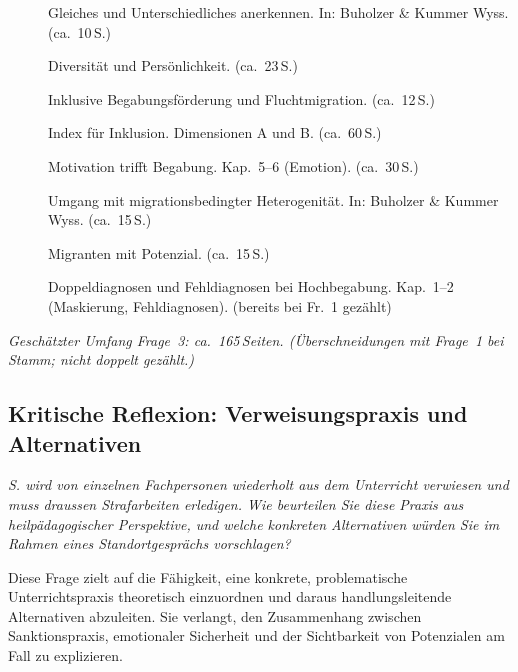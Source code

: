 \documentclass[ngerman, a4paper]{article}
\begin{document}
\begin{description}
  \item[\cite{grossrieder2010anerkennung}] Gleiches und Unterschiedliches anerkennen. In: Buholzer \& Kummer Wyss. (ca.~10\,S.)
  \item[\cite{kuhl2019diversitaet}] Diversität und Persönlichkeit. (ca.~23\,S.)
  \item[\cite{behrensen2019inklusive}] Inklusive Begabungsförderung und Fluchtmigration. (ca.~12\,S.)
  \item[\cite{booth2019index}] Index für Inklusion. Dimensionen A und B. (ca.~60\,S.)
  \item[\cite{lehwald2017motivation}] Motivation trifft Begabung. Kap.~5--6 (Emotion). (ca.~30\,S.)
  \item[\cite{kappus2010migration}] Umgang mit migrationsbedingter Heterogenität. In: Buholzer \& Kummer Wyss. (ca.~15\,S.)
  \item[\cite{stamm2012migranten}] Migranten mit Potenzial. (ca.~15\,S.)
  \item[\cite{webb2020doppeldiagnosen}] Doppeldiagnosen und Fehldiagnosen bei
    Hochbegabung. Kap.~1--2 (Maskierung, Fehldiagnosen). (bereits bei Fr.~1 gezählt)
\end{description}
 
\textit{Geschätzter Umfang Frage~3: ca.~165\,Seiten.
(Überschneidungen mit Frage~1 bei Stamm; nicht doppelt gezählt.)}
 

 


\subsection{Kritische Reflexion: Verweisungspraxis und Alternativen}


\begin{tcolorbox}[colback=gray!5, colframe=gray!50, title=Weiterführende Diskurslinie]
\itshape
S. wird von einzelnen Fachpersonen wiederholt aus dem Unterricht verwiesen und
muss draussen Strafarbeiten erledigen. Wie beurteilen Sie diese Praxis aus
heilpädagogischer Perspektive, und welche konkreten Alternativen würden Sie
im Rahmen eines Standortgesprächs vorschlagen?
\end{tcolorbox}

Diese Frage zielt auf die Fähigkeit, eine konkrete, problematische Unterrichtspraxis
theoretisch einzuordnen und daraus handlungsleitende Alternativen abzuleiten. Sie
verlangt, den Zusammenhang zwischen Sanktionspraxis, emotionaler Sicherheit und
der Sichtbarkeit von Potenzialen am Fall zu explizieren.
\end{document}
